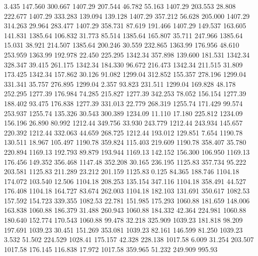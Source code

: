    3.435  147.560  300.667      1407.29
 207.544   46.782   55.163      1407.29
 203.553   28.808  222.677      1407.29
 333.283  139.094  139.128      1407.29
 357.212   56.628  205.000      1407.29
 314.263   29.964  283.477      1407.29
 358.731   87.619  191.466      1407.29
 149.537  163.605  141.831      1385.64
 106.832   31.773   85.514      1385.64
 165.807   35.711  247.966      1385.64
  15.031   38.921  214.507      1385.64
 200.246   30.559  232.865      1363.99
 176.956   48.610  253.959      1363.99
 192.978   22.450  225.295      1342.34
 357.898  139.600  181.531      1342.34
 328.347   39.415  261.175      1342.34
 184.330   96.672  216.473      1342.34
 211.515   31.809  173.425      1342.34
 157.862   30.126   91.082      1299.04
 312.852  155.357  278.196      1299.04
 331.341   35.757  276.895      1299.04
   2.357   93.823  231.511      1299.04
 169.828   48.178  252.295      1277.39
 176.984   74.285  215.827      1277.39
 342.253   78.052  156.154      1277.39
 188.402   93.475  176.838      1277.39
 331.013   22.779  268.319      1255.74
 171.429   99.574  253.937      1255.74
 135.326   30.543  300.389      1234.09
  11.110   17.180  225.812      1234.09
 156.196   26.890   80.992      1212.44
 349.756   33.930  243.779      1212.44
 243.934  145.657  220.392      1212.44
 332.063   44.659  268.725      1212.44
 193.012  129.851    7.654      1190.78
 130.511   18.967  105.497      1190.78
 359.824  115.403  219.609      1190.78
 358.407   35.780  220.894      1169.13
 192.793   89.879  193.944      1169.13
 142.152  156.300  106.950      1169.13
 176.456  149.352  356.468      1147.48
 352.208   30.165  236.195      1125.83
 357.734   95.222  203.581      1125.83
 211.289   23.212  201.159      1125.83
   0.125   84.365  188.746      1104.18
 174.072  103.540   12.506      1104.18
 208.253  135.154  347.116      1104.18
 358.491   44.527  176.408      1104.18
 164.727   83.674  262.003      1104.18
 182.103  131.691  350.617      1082.53
 157.592  154.723  339.355      1082.53
  22.781  151.985  175.293      1060.88
 181.659  148.006  163.838      1060.88
 186.379   31.488  260.943      1060.88
 184.332   42.364  224.981      1060.88
 180.640  152.774  170.543      1060.88
  99.478   32.218  325.909      1039.23
 181.818   98.209  197.691      1039.23
  30.451  151.269  353.081      1039.23
  82.161  146.599   81.250      1039.23
   3.532   51.502  224.529      1028.41
 175.157   42.328  228.138      1017.58
   6.009   31.254  203.507      1017.58
 176.145  116.838   17.972      1017.58
 359.965   51.232  249.909       995.93

